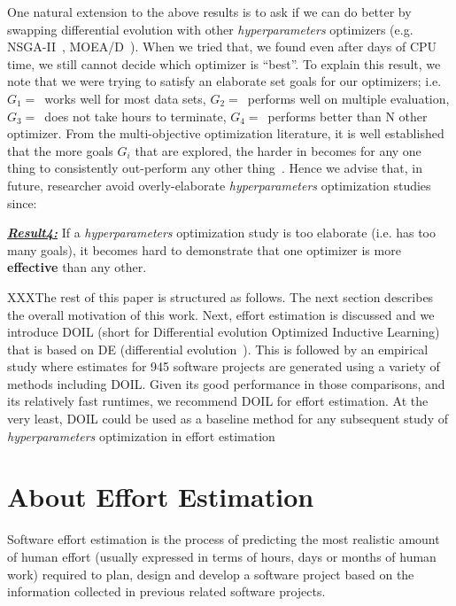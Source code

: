 \documentclass[10pt,conference]{IEEEtran}
\newenvironment{result}[2]
{\begin{myshadowbox}\textbf{\textit{\underline{Result#1:}}} #2}{ 
\end{myshadowbox}}
\begin{document}
One natural extension to the above results
 is to ask  if we can do better by swapping
 differential evolution with other {\em hyperparameters} optimizers
 (e.g.   NSGA-II~\cite{deb02}, MOEA/D~\cite{Zhang07}).
 When we tried that, we found even after days of CPU time, we still cannot   decide  which optimizer is ``best''.
To explain this result, we note that  we were trying
to satisfy an elaborate set
goals for our optimizers; i.e. $G_1=$~works well for  most data sets,  $G_2=$~performs well on multiple evaluation, $G_3=$~does
not take hours to terminate,  $G_4=$~performs better than N other optimizer.
From the multi-objective optimization literature, it is well established
that the more goals $G_i$  that are explored,
the harder in becomes for any one thing to consistently out-perform any other thing~\cite{sayyad2013value,Wagner:2007}.
Hence  we advise that, in future,  researcher avoid  overly-elaborate {\em hyperparameters} optimization studies since:
\begin{result}{4}
If a  
 {\em hyperparameters} optimization study is too elaborate (i.e. has too many goals),  it becomes hard to demonstrate that one optimizer is 
 more {\bf effective} than any other.  
 \end{result}


XXXThe rest of this paper is structured as follows.
The next section describes the overall motivation of this work.
Next, effort estimation is discussed and we  introduce DOIL
(short for   Differential evolution Optimized Inductive Learning) that is based on DE (differential
evolution~\cite{storn1997differential}).
This is followed by an empirical study where estimates for 945 software projects are generated using
a variety of methods including DOIL.
Given its good performance in those comparisons, and its relatively
fast runtimes, 
   we
recommend  DOIL  for  effort  estimation.  At  the  very  least,
DOIL could be used as a baseline method for any subsequent
study  of  {\em hyperparameters}  optimization  in  effort  estimation


\section{About Effort Estimation} 
Software effort estimation is the process of predicting the most realistic amount of human effort (usually expressed in terms of hours, days or months of human work) required to plan, design and develop a software project based on the information collected in previous related software projects.
\end{document}
